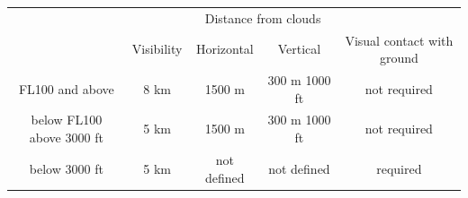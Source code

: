 \begin{table}[h]
	\begin{center}
		\begin{tabular}[c]{|c|c|c|c|c|}
			\cellcolor{vred}                                     & \cellcolor{vred}                                          & \multicolumn{2}{|c|}{\color{white}\cellcolor{vred}Distance from clouds} & \cellcolor{vred}                                                                                                  \\\hhline{~~--~}
			\multirow{-2}{*}{\color{white}\cellcolor{vred}Level} & \multirow{-2}{*}{\color{white}\cellcolor{vred}Visibility} & \color{white}\cellcolor{vred}Horizontal                                 & \color{white}\cellcolor{vred}Vertical & \multirow{-2}{*}{\color{white}\cellcolor{vred}Visual contact with ground} \\\hline
			FL100 and above                                      & 8 km                                                      & 1500 m                                                                  & 300 m 1000 ft                         & not required                                                              \\\hline
			below FL100 above 3000 ft                            & 5 km                                                      & 1500 m                                                                  & 300 m 1000 ft                         & not required                                                              \\\hline
			below 3000 ft                                        & 5 km                                                      & not defined                                                             & not defined                           & required                                                                  \\\hline
		\end{tabular}
	\end{center}
\end{table}

